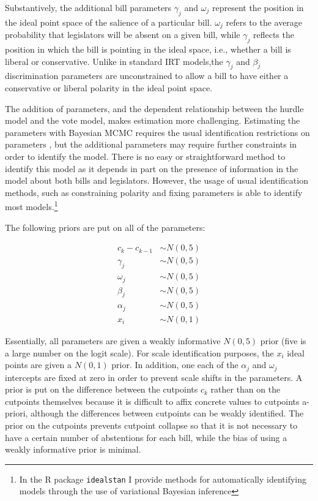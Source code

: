 	Substantively, the additional bill parameters $\gamma_j$ and $\omega_j$ represent the position in the ideal point space of the salience of a particular bill. $\omega_j$ refers to the average probability that legislators will be absent on a given bill, while $\gamma_j$ reflects the position in which the bill is pointing in the ideal space, i.e., whether a bill is liberal or conservative. Unlike in standard IRT models,the $\gamma_j$ and $\beta_j$ discrimination parameters are unconstrained to allow a bill to have either a conservative or liberal polarity in the ideal point space. 
	
	The addition of parameters, and the dependent relationship between the hurdle model and the vote model, makes estimation more challenging. Estimating the parameters with Bayesian MCMC requires the usual identification restrictions on parameters \parencite{jackman2004,gelman2005}, but the additional parameters may require further constraints in order to identify the model. There is no easy or straightforward method to identify this model as it depends in part on the presence of information in the model about both bills and legislators. However, the usage of usual identification methods, such as constraining polarity and fixing parameters is able to identify most models.\footnote{In the R package \texttt{idealstan} I provide methods for automatically identifying models through the use of variational Bayesian inference}
	
	The following priors are put on all of the parameters:
	
	\begin{align*}
		c_k - c_{k-1} &\sim N(0,5)\\
		\gamma_j &\sim N(0,5)\\
		\omega_j &\sim N(0,5)\\
		\beta_j &\sim N(0,5)\\
		\alpha_j &\sim N(0,5)\\
		x_i &\sim N(0,1)
	\end{align*}

	
	Essentially, all parameters are given a weakly informative $N(0,5)$ prior (five is a large number on the logit scale). For scale identification purposes, the $x_i$ ideal points are given a $N(0,1)$ prior. In addition, one each of the $\alpha_j$ and $\omega_j$ intercepts are fixed at zero in order to prevent scale shifts in the parameters. A prior is put on the difference between the cutpoints $c_k$ rather than on the cutpoints themselves because it is difficult to affix concrete values to cutpoints a-priori, although the differences between cutpoints can be weakly identified. The prior on the cutpoints prevents cutpoint collapse so that it is not necessary to have a certain number of abstentions for each bill, while the bias of using a weakly informative prior is minimal.
	
